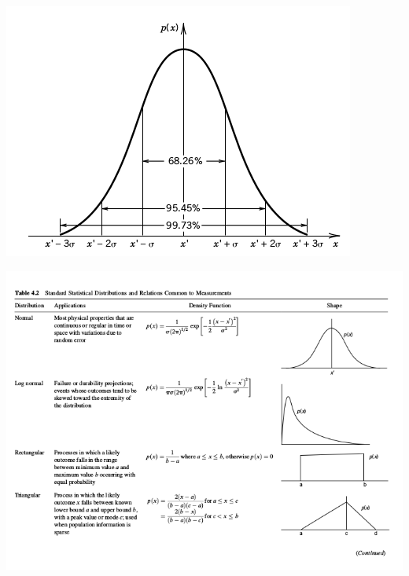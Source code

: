 \documentclass[11pt]{article}
\begin{document}
\begin{itemize}
\begin{itemize}
		
		
		
		\newpage
		\includegraphics[scale=1.5]{lecture1_fig4.png}

		\newpage
		\includegraphics[scale=.8]{lecture1_fig2.png}


\end{itemize}
\end{itemize}
\end{document}
